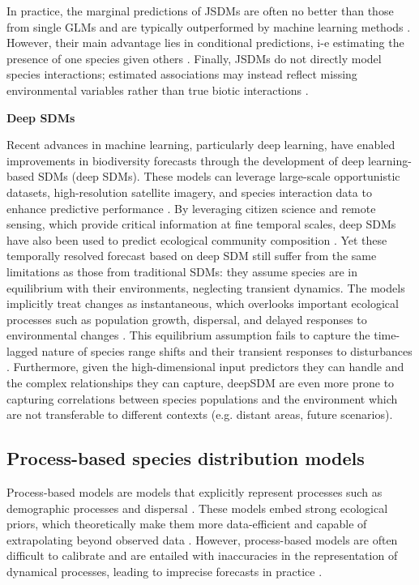 In practice, the marginal predictions of JSDMs are often no better than those from single GLMs \cite{poggiato2021interpretations} and are typically outperformed by machine learning methods \cite{norberg2019comprehensive}. However, their main advantage lies in conditional predictions, i-e estimating the presence of one species given others \cite{wilkinson2021defining}. Finally, JSDMs do not directly model species interactions; estimated associations may instead reflect missing environmental variables rather than true biotic interactions \cite{blanchet2020co}.

\noindent\textbf{Deep SDMs}

Recent advances in machine learning, particularly deep learning, have enabled improvements in biodiversity forecasts through the development of deep learning-based SDMs (deep SDMs). These models can leverage large-scale opportunistic datasets, high-resolution satellite imagery, and species interaction data to enhance predictive performance \cite{brun2024, cole2023, Deneu2021, zbinden2024on}. 
By leveraging citizen science and remote sensing, which provide critical information at fine temporal scales, deep SDMs have also been used to predict ecological community composition \cite{gillespie2024,dollinger2024,hu2025introduction}.
% 
Yet these temporally resolved forecast based on deep SDM still suffer from the same limitations as those from traditional SDMs: they assume species are in equilibrium with their environments, neglecting transient dynamics. The models implicitly treat changes as instantaneous, which overlooks important ecological processes such as population growth, dispersal, and delayed responses to environmental changes \cite{isaac2014, zurell}. This equilibrium assumption fails to capture the time-lagged nature of species range shifts and their transient responses to disturbances \cite{barber-omalley2022}. Furthermore, given the high-dimensional input predictors they can handle and the complex relationships they can capture, deepSDM are even more prone to capturing correlations between species populations and the environment which are not transferable to different contexts (e.g. distant areas, future scenarios).

\subsection{Process-based species distribution models}
Process-based models are models that explicitly represent processes such as demographic processes and dispersal \cite{cantrell2004, bonneau2016}. These models embed strong ecological priors, which theoretically make them more data-efficient and capable of extrapolating beyond observed data \cite{cabral2017, briscoe2019}. However, process-based models are often difficult to calibrate and are entailed with inaccuracies in the representation of dynamical processes, leading to imprecise forecasts in practice \cite{evans2016a, connolly2017, Scheiter2013, boussange2024}.


